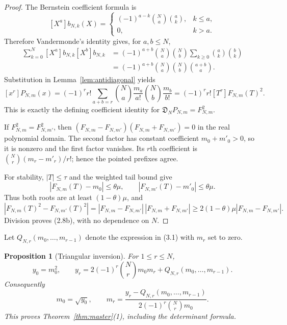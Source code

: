 \documentclass[11pt]{article}
\newtheorem{proposition}[theorem]{Proposition}
\theoremstyle{remark}
\begin{document}
\begin{proof}
The Bernstein coefficient formula is
\[
 [X^a]b_{N,k}(X)=
 \begin{cases}
 (-1)^{a-k}\binom Na\binom ak,&k\le a,\\
 0,&k>a.
 \end{cases}
\]
Therefore Vandermonde's identity gives, for $a,b\le N$,
\begin{align*}
 \sum_{k=0}^N[X^a]b_{N,k}[X^b]b_{N,k}
 &=(-1)^{a+b}\binom Na\binom Nb
   \sum_{k\ge0}\binom ak\binom bk\\
 &=(-1)^{a+b}\binom Na\binom Nb\binom{a+b}{a}.
\end{align*}
Substitution in Lemma~\ref{lem:antidiagonal} yields
\[
 [x^r]P_{N,m}(x)
 =(-1)^r r!\sum_{a+b=r}
   \binom Na\frac{m_a}{a!}\binom Nb\frac{m_b}{b!}
 =(-1)^r r![T^r]F_{N,m}(T)^2.
\]
This is exactly the defining coefficient identity for
$\mathfrak D_NP_{N,m}=F_{N,m}^2$.

If $F_{N,m}^2=F_{N,m'}^2$, then
$(F_{N,m}-F_{N,m'})(F_{N,m}+F_{N,m'})=0$ in the real polynomial domain.  The second factor has
constant coefficient $m_0+m'_0>0$, so it is nonzero and the first factor vanishes.  Its $r$th
coefficient is $\binom Nr(m_r-m'_r)/r!$; hence the pointed prefixes agree.

For stability, $|T|\le\tau$ and the weighted tail bound give
\[
 |F_{N,m}(T)-m_0|\le\theta\mu,
 \qquad |F_{N,m'}(T)-m'_0|\le\theta\mu.
\]
Thus both roots are at least $(1-\theta)\mu$, and
\[
 |F_{N,m}(T)^2-F_{N,m'}(T)^2|
 =|F_{N,m}-F_{N,m'}|\,|F_{N,m}+F_{N,m'}|
 \ge2(1-\theta)\mu|F_{N,m}-F_{N,m'}|.
\]
Division proves (2.8b), with no dependence on $N$.
\end{proof}

Let $Q_{N,r}(m_0,\ldots,m_{r-1})$ denote the expression in (3.1) with $m_r$ set to zero.

\begin{proposition}[Triangular inversion]
\label{prop:chart}
For $1\le r\le N$,
\begin{equation}
 y_0=m_0^2,\qquad
 y_r=2(-1)^r\binom Nr m_0m_r+Q_{N,r}(m_0,\ldots,m_{r-1}).
 \tag{3.2}
\end{equation}
Consequently
\begin{equation}
 m_0=\sqrt{y_0},\qquad
 m_r=\frac{y_r-Q_{N,r}(m_0,\ldots,m_{r-1})}
 {2(-1)^r\binom Nr m_0}.
 \tag{3.3}
\end{equation}
This proves Theorem~\ref{thm:master}(1), including the determinant formula.
\end{proposition}
\end{document}
